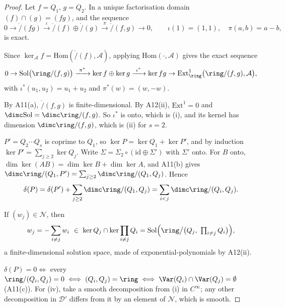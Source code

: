 \begin{proof}
Let $f=Q_1$, $g=Q_2$. In a unique factorisation domain $(f)\cap(g)=(fg)$, and the sequence
\[
0\to\ring/(fg)\xrightarrow{\ \iota\ }\ring/(f)\oplus\ring/(g)\xrightarrow{\ \pi\ }\ring/(f,g)\to0,
\qquad \iota(1)=(1,1),\quad \pi(a,b)=a-b,
\]
is exact.

Since $\ker_{\mathcal A}f=\mathrm{Hom}(\ring/(f),\mathcal A)$, applying $\mathrm{Hom}(\cdot,\mathcal A)$ gives the exact sequence
\[
0\to\mathrm{Sol}\big(\ring/(f,g)\big)\xrightarrow{\ \pi^*\ }\ker f\oplus\ker g\xrightarrow{\ \iota^*\ }\ker fg\to\mathrm{Ext}^1_\ring\big(\ring/(f,g),\mathcal A\big),
\]
with $\iota^*(u_1,u_2)=u_1+u_2$ and $\pi^*(w)=(w,-w)$.

By A11(a), $\ring/(f,g)$ is finite-dimensional. By A12(ii), $\mathrm{Ext}^1=0$ and $\dimc\mathrm{Sol}=\dimc\ring/(f,g)$. So $\iota^*$ is onto, which is (i), and its kernel has dimension $\dimc\ring/(f,g)$, which is (ii) for $s=2$.

$P'=Q_2\cdots Q_s$ is coprime to $Q_1$, so $\ker P=\ker Q_1+\ker P'$, and by induction $\ker P'=\sum_{j\ge2}\ker Q_j$. Write $\Sigma=\Sigma_2\circ(\mathrm{id}\oplus\Sigma')$ with $\Sigma'$ onto. For $B$ onto, $\dim\ker(AB)=\dim\ker B+\dim\ker A$, and A11(b) gives $\dimc\ring/(Q_1,P')=\sum_{j\ge2}\dimc\ring/(Q_1,Q_j)$. Hence
\[
\delta(P)=\delta(P')+\sum_{j\ge2}\dimc\ring/(Q_1,Q_j)=\sum_{i<j}\dimc\ring/(Q_i,Q_j).
\]

If $(w_j)\in\mathcal N$, then
\[
w_j=-\sum_{i\ne j}w_i\ \in\ \ker Q_j\cap\ker\prod_{i\ne j}Q_i=\mathrm{Sol}\Big(\ring\big/\big(Q_j,\ \textstyle\prod_{i\ne j}Q_i\big)\Big),
\]
a finite-dimensional solution space, made of exponential-polynomials by A12(ii).

$\delta(P)=0\iff$ every $\ring/(Q_i,Q_j)=0\iff(Q_i,Q_j)=\ring\iff\Var(Q_i)\cap\Var(Q_j)=\emptyset$ (A11(c)). For (iv), take a smooth decomposition from (i) in $C^\infty$; any other decomposition in $\mathcal D'$ differs from it by an element of $\mathcal N$, which is smooth.

\end{proof}

